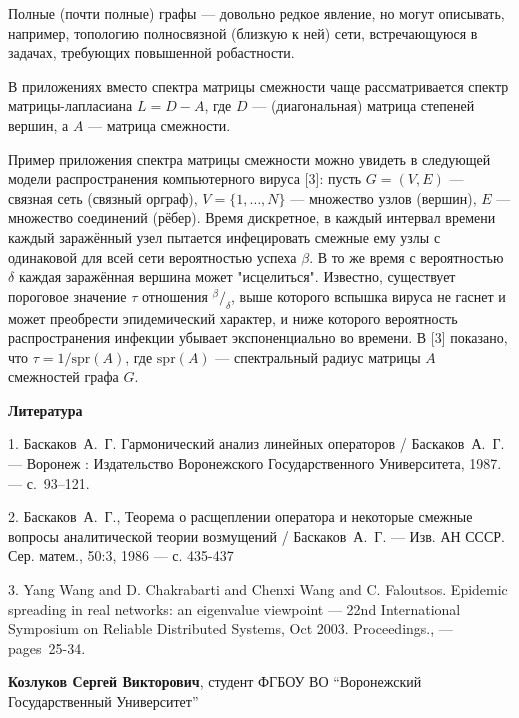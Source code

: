 \documentclass[11pt]{article}
\begin{document}
Полные (почти полные) графы --- довольно редкое явление,
но могут описывать, например, топологию полносвязной (близкую к ней) сети,
встречающуюся в задачах, требующих повышенной робастности.

В приложениях вместо спектра матрицы смежности чаще рассматривается
спектр матрицы-лапласиана \( L = D - A \),
где \( D \) --- (диагональная) матрица степеней вершин,
а \( A \) --- матрица смежности.

Пример приложения спектра матрицы смежности можно увидеть
в следующей модели распространения компьютерного вируса [3]:
пусть \( G = (V, E) \) --- связная сеть (связный орграф),
\( V = \{1, \ldots, N\} \) --- множество узлов (вершин),
\( E \) --- множество соединений (рёбер).
Время дискретное, в каждый интервал времени каждый заражённый узел
пытается инфецировать смежные ему узлы с одинаковой для всей сети вероятностью успеха \( \beta \).
В то же время с вероятностью \( \delta \) каждая заражённая вершина может "исцелиться".
Известно, существует пороговое значение \( \tau \) отношения \( {^\beta}/_{\delta} \),
выше которого вспышка вируса не гаснет и может преобрести эпидемический характер,
и ниже которого вероятность распространения инфекции убывает экспоненциально во времени.
В [3] показано, что \( \tau = 1/\mathrm{spr}\left({A}\right) \),
где \( \mathrm{spr}\left({A}\right) \) --- спектральный радиус матрицы \( A \) смежностей графа \( G \).

\centerline{\textbf{Литература}}

1. Баскаков~А.~Г. Гармонический анализ линейных операторов
    / Баскаков~А.~Г.
    --- Воронеж : Издательство Воронежского Государственного Университета,
        1987.
    ---  с.~93--121.

2. Баскаков~А.~Г., Теорема о расщеплении оператора и некоторые смежные вопросы аналитической теории возмущений
    / Баскаков~А.~Г.
    --- Изв. АН СССР. Сер. матем., 50:3, 1986
    --- с. 435-437

3. Yang Wang and D. Chakrabarti and Chenxi Wang and C. Faloutsos.
    Epidemic spreading in real networks: an eigenvalue viewpoint
        --- 22nd International Symposium on Reliable Distributed Systems, Oct 2003. Proceedings., --- pages~25-34.

{\bf Козлуков Сергей Викторович}, студент ФГБОУ ВО ``Воронежский Государственный Университет''
\end{document}
